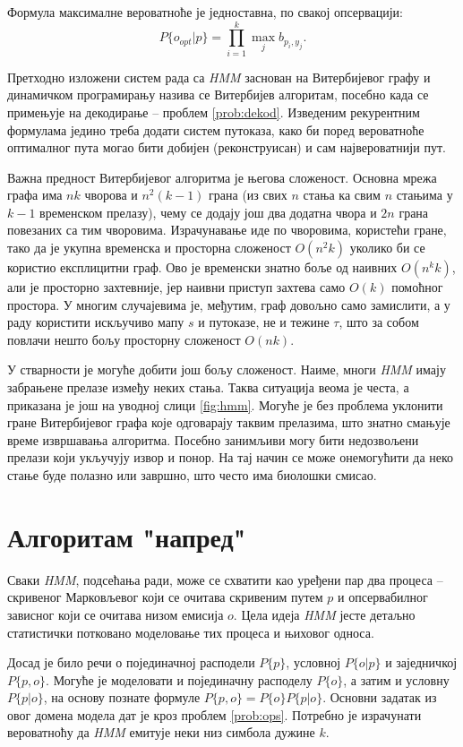 \documentclass[12pt,oneside]{memoir}
\begin{document}
\begin{CJK}{UTF8}{ipxm}
Формула максималне вероватноће је једноставна, по свакој опсервацији: $$P\{o_{opt} | p\} = \prod_{i=1}^k \max_j b_{p_i, y_j}.$$

Претходно изложени систем рада са \textit{HMM} заснован на Витербијевог графу и динамичком програмирању назива се Витербијев алгоритам\cite{ba10c}, посебно када се примењује на декодирање -- проблем \ref{prob:dekod}. Изведеним рекурентним формулама једино треба додати систем путоказа, како би поред вероватноће оптималног пута могао бити добијен (реконструисан) и сам највероватнији пут.

Важна предност Витербијевог алгоритма је његова сложеност. Основна мрежа графа има $nk$ чворова и $n^2 (k-1)$ грана (из свих $n$ стања ка свим $n$ стањима у $k-1$ временском прелазу), чему се додају још два додатна чвора и $2n$ грана повезаних са тим чворовима. Израчунавање иде по чворовима, користећи гране, тако да је укупна временска и просторна сложеност $O(n^2 k)$ уколико би се користио експлицитни граф. Ово је временски знатно боље од наивних $O(n^k k)$, али је просторно захтевније, јер наивни приступ захтева само $O(k)$ помоћног простора. У многим случајевима је, међутим, граф довољно само замислити, а у раду користити искључиво мапу $s$ и путоказе, не и тежине $\tau$, што за собом повлачи нешто бољу просторну сложеност $O(nk)$.

У стварности је могуће добити још бољу сложеност. Наиме, многи \textit{HMM} имају забрањене прелазе између неких стања. Таква ситуација веома је честа, а приказана је још на уводној слици \ref{fig:hmm}. Могуће је без проблема уклонити гране Витербијевог графа које одговарају таквим прелазима, што знатно смањује време извршавања алгоритма. Посебно занимљиви могу бити недозвољени прелази који укључују извор и понор. На тај начин се може онемогућити да неко стање буде полазно или завршно, што често има биолошки смисао.

\section{Алгоритам "напред"}
Сваки \textit{HMM}, подсећања ради, може се схватити као уређени пар два процеса -- скривеног Марковљевог који се очитава скривеним путем $p$ и опсервабилног зависног који се очитава низом емисија $o$. Цела идеја \textit{HMM} јесте детаљно статистички потковано моделовање тих процеса и њиховог односа.

Досад је било речи о појединачној расподели $P\{p\}$, условној $P\{o | p\}$ и заједничкој $P\{p, o\}$. Могуће је моделовати и појединачну расподелу $P\{o\}$, а затим и условну $P\{p | o\}$, на основу познате формуле $P\{p, o\} = P\{o\} P\{p | o\}$. Основни задатак из овог домена модела дат је кроз проблем \ref{prob:ops}. Потребно је израчунати вероватноћу да \textit{HMM} емитује неки низ симбола дужине $k$.


\end{CJK}
\end{document}
